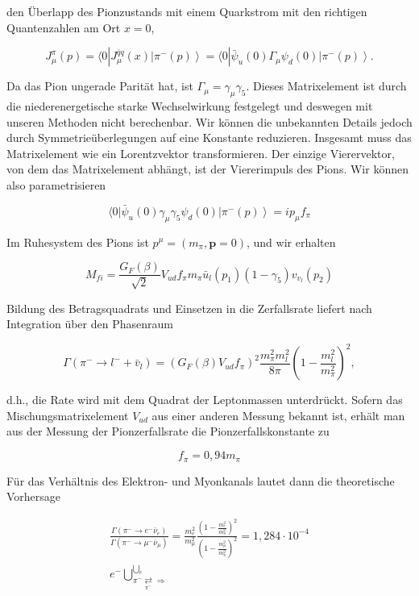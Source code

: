 \documentclass[10pt, letterpaper]{article}
\begin{document}
den Überlapp des Pionzustands mit einem Quarkstrom mit den richtigen Quantenzahlen am Ort $x=0$,

$$
J_{\mu}^{\pi}(p)=\langle 0| J_{\mu}^{\bar{q} q}(x)\left|\pi^{-}(p)\right\rangle=\langle 0| \bar{\psi}_{u}(0) \Gamma_{\mu} \psi_{d}(0)\left|\pi^{-}(p)\right\rangle .
$$

Da das Pion ungerade Parität hat, ist $\Gamma_{\mu}=\gamma_{\mu} \gamma_{5}$. Dieses Matrixelement ist durch die niederenergetische starke Wechselwirkung festgelegt und deswegen mit unseren Methoden nicht berechenbar. Wir können die unbekannten Details jedoch durch Symmetrieüberlegungen auf eine Konstante reduzieren. Insgesamt muss das Matrixelement wie ein Lorentzvektor transformieren. Der einzige Vierervektor, von dem das Matrixelement abhängt, ist der Viererimpuls des Pions. Wir können also parametrisieren

$$
\langle 0| \bar{\psi}_{u}(0) \gamma_{\mu} \gamma_{5} \psi_{d}(0)\left|\pi^{-}(p)\right\rangle=i p_{\mu} f_{\pi}
$$

Im Ruhesystem des Pions ist $p^{\mu}=\left(m_{\pi}, \mathbf{p}=0\right)$, und wir erhalten

$$
M_{f i}=\frac{G_{F}(\beta)}{\sqrt{2}} V_{u d} f_{\pi} m_{\pi} \bar{u}_{l}\left(p_{1}\right)\left(1-\gamma_{5}\right) v_{v_{l}}\left(p_{2}\right)
$$

Bildung des Betragsquadrats und Einsetzen in die Zerfallsrate liefert nach Integration über den Phasenraum

$$
\Gamma\left(\pi^{-} \rightarrow l^{-}+\bar{v}_{l}\right)=\left(G_{F}(\beta) V_{u d} f_{\pi}\right)^{2} \frac{m_{\pi}^{2} m_{l}^{2}}{8 \pi}\left(1-\frac{m_{l}^{2}}{m_{\pi}^{2}}\right)^{2},
$$

d.h., die Rate wird mit dem Quadrat der Leptonmassen unterdrückt. Sofern das Mischungsmatrixelement $V_{u d}$ aus einer anderen Messung bekannt ist, erhält man aus der Messung der Pionzerfallsrate die Pionzerfallskonstante zu

$$
f_{\pi}=0,94 m_{\pi}
$$

Für das Verhältnis des Elektron- und Myonkanals lautet dann die theoretische Vorhersage

$$
\begin{gathered}
\frac{\Gamma\left(\pi^{-} \rightarrow e^{-} \bar{\nu}_{e}\right)}{\Gamma\left(\pi^{-} \rightarrow \mu^{-} \bar{\nu}_{\mu}\right)}=\frac{m_{e}^{2}}{m_{\mu}^{2}} \frac{\left(1-\frac{m_{e}^{2}}{m_{\pi}^{2}}\right)^{2}}{\left(1-\frac{m_{\mu}^{2}}{m_{\pi}^{2}}\right)^{2}}=1,284 \cdot 10^{-4} \\
e^{-} \bigcup_{\pi^{-} \underset{\pi^{-}}{\rightleftarrows} \Rightarrow}^{\bigcup_{e}}
\end{gathered}
$$
\end{document}
